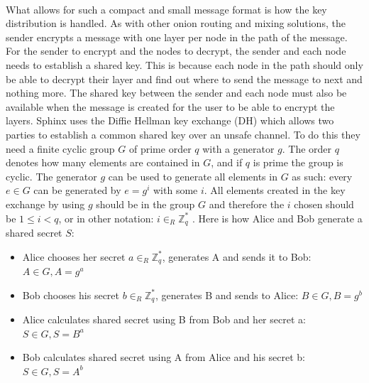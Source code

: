\documentclass[informationsecurity]{gucmasterproject}
\begin{document}
\paragraph{}
What allows for such a compact and small message format is how the key distribution is handled. As with other onion routing and mixing solutions, the sender encrypts a message with one layer per node in the path of the message. For the sender to encrypt and the nodes to decrypt, the sender and each node needs to establish a shared key. This is because each node in the path should only be able to decrypt their layer and find out where to send the message to next and nothing more. The shared key between the sender and each node must also be available when the message is created for the user to be able to encrypt the layers.
Sphinx uses the Diffie Hellman key exchange (DH) \cite{diffie1976new} which allows two parties to establish a common shared key over an unsafe channel. 
To do this they need a finite cyclic group $G$ of prime order $q$ with a generator $g$. The order $q$ denotes how many elements are contained in $G$, and if $q$ is prime the group is cyclic. The generator $g$ can be used to generate all elements in $G$ as such: every $e\in G$ can be generated by $e=g^i$ with some $i$. All elements created in the key exchange by using $g$ should be in the group $G$ and therefore the $i$ chosen should be $1 \leq i < q$, or in other notation: $i \in _R \mathbb{Z}_q^*$ \cite{algebra}. Here is how Alice and Bob generate a shared secret $S$:

\begin{itemize}
    \item Alice chooses her secret $a \in _R \mathbb{Z}_q^*$, generates A and sends it to Bob:  $A\in G, A = g^a  $
    \item Bob chooses his secret $b \in _R \mathbb{Z}_q^*$, generates B and sends to Alice:  $ B\in G, B = g^b$
    \item Alice calculates shared secret using B from Bob and her secret a: $ S \in G, S = B^a $
    \item Bob calculates shared secret using A from Alice and his secret b: $ S \in G, S = A^b $
\end{itemize}
\end{document}
